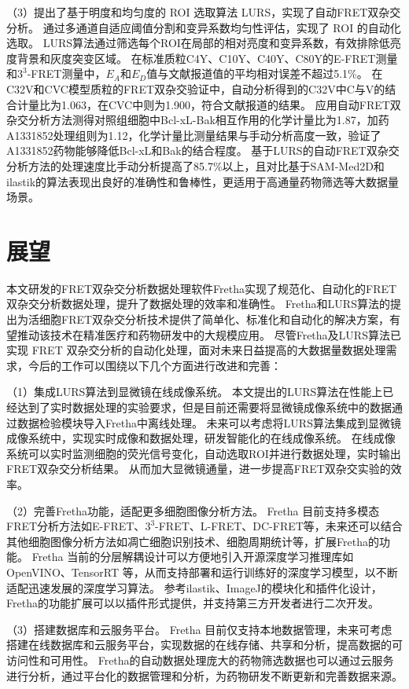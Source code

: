 （3）提出了基于明度和均匀度的 ROI 选取算法 LURS，实现了自动FRET双杂交分析。
通过多通道自适应阈值分割和变异系数均匀性评估，实现了 ROI 的自动化选取。
LURS算法通过筛选每个ROI在局部的相对亮度和变异系数，有效排除低亮度背景和灰度突变区域。
在标准质粒C4Y、C10Y、C40Y、C80Y的E-FRET测量和$3^3$-FRET测量中，$E_{A}$和$E_{D}$值与文献报道值的平均相对误差不超过5.1\%。
在C32V和CVC模型质粒的FRET双杂交验证中，自动分析得到的C32V中C与V的结合计量比为1.063，在CVC中则为1.900，符合文献报道的结果。
应用自动FRET双杂交分析方法测得对照组细胞中Bcl-xL-Bak相互作用的化学计量比为1.87，加药A1331852处理组则为1.12，化学计量比测量结果与手动分析高度一致，验证了A1331852药物能够降低Bcl-xL和Bak的结合程度。
基于LURS的自动FRET双杂交分析方法的处理速度比手动分析提高了85.7\%以上，且对比基于SAM-Med2D和ilastik的算法表现出良好的准确性和鲁棒性，更适用于高通量药物筛选等大数据量场景。

\section{展望}
本文研发的FRET双杂交分析数据处理软件Fretha实现了规范化、自动化的FRET双杂交分析数据处理，提升了数据处理的效率和准确性。
Fretha和LURS算法的提出为活细胞FRET双杂交分析技术提供了简单化、标准化和自动化的解决方案，有望推动该技术在精准医疗和药物研发中的大规模应用。
尽管Fretha及LURS算法已实现 FRET 双杂交分析的自动化处理，面对未来日益提高的大数据量数据处理需求，今后的工作可以围绕以下几个方面进行改进和完善：

（1）集成LURS算法到显微镜在线成像系统。
本文提出的LURS算法在性能上已经达到了实时数据处理的实验要求，但是目前还需要将显微镜成像系统中的数据通过数据检验模块导入Fretha中离线处理。
未来可以考虑将LURS算法集成到显微镜成像系统中，实现实时成像和数据处理，研发智能化的在线成像系统。
在线成像系统可以实时监测细胞的荧光信号变化，自动选取ROI并进行数据处理，实时输出FRET双杂交分析结果。
从而加大显微镜通量，进一步提高FRET双杂交实验的效率。

（2）完善Fretha功能，适配更多细胞图像分析方法。
Fretha 目前支持多模态FRET分析方法如E-FRET、$3^3$-FRET、L-FRET、DC-FRET等，未来还可以结合其他细胞图像分析方法如凋亡细胞识别技术、细胞周期统计等，扩展Fretha的功能。
Fretha 当前的分层解耦设计可以方便地引入开源深度学习推理库如 OpenVINO、TensorRT 等，从而支持部署和运行训练好的深度学习模型，以不断适配迅速发展的深度学习算法。
参考ilastik、ImageJ的模块化和插件化设计，Fretha的功能扩展可以以插件形式提供，并支持第三方开发者进行二次开发。

（3）搭建数据库和云服务平台。
Fretha 目前仅支持本地数据管理，未来可考虑搭建在线数据库和云服务平台，实现数据的在线存储、共享和分析，提高数据的可访问性和可用性。
Fretha的自动数据处理庞大的药物筛选数据也可以通过云服务进行分析，通过平台化的数据管理和分析，为药物研发不断更新和完善数据来源。